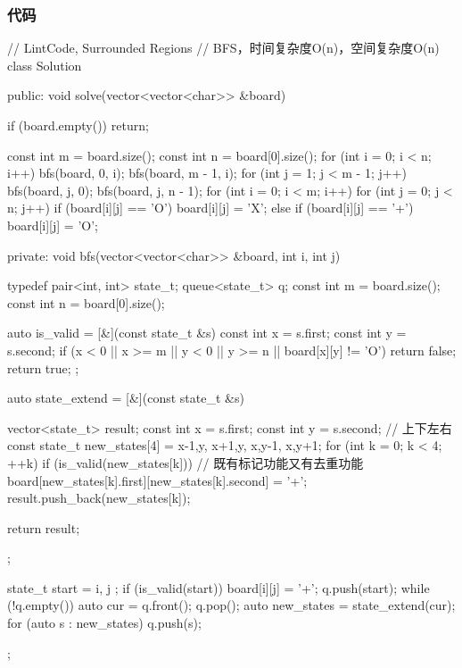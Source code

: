 \subsubsection{代码}
\begin{Code}
// LintCode, Surrounded Regions
// BFS，时间复杂度O(n)，空间复杂度O(n)
class Solution {
public:
    void solve(vector<vector<char>> &board) {
        if (board.empty()) return;

        const int m = board.size();
        const int n = board[0].size();
        for (int i = 0; i < n; i++) {
            bfs(board, 0, i);
            bfs(board, m - 1, i);
        }
        for (int j = 1; j < m - 1; j++) {
            bfs(board, j, 0);
            bfs(board, j, n - 1);
        }
        for (int i = 0; i < m; i++)
            for (int j = 0; j < n; j++)
                if (board[i][j] == 'O')
                    board[i][j] = 'X';
                else if (board[i][j] == '+')
                    board[i][j] = 'O';
    }
private:
    void bfs(vector<vector<char>> &board, int i, int j) {
        typedef pair<int, int> state_t;
        queue<state_t> q;
        const int m = board.size();
        const int n = board[0].size();

        auto is_valid = [&](const state_t &s) {
            const int x = s.first;
            const int y = s.second;
            if (x < 0 || x >= m || y < 0 || y >= n || board[x][y] != 'O')
                return false;
            return true;
        };

        auto state_extend = [&](const state_t &s) {
            vector<state_t> result;
            const int x = s.first;
            const int y = s.second;
            // 上下左右
            const state_t new_states[4] = {{x-1,y}, {x+1,y},
                    {x,y-1}, {x,y+1}};
            for (int k = 0; k < 4;  ++k) {
                if (is_valid(new_states[k])) {
                    // 既有标记功能又有去重功能
                    board[new_states[k].first][new_states[k].second] = '+';
                    result.push_back(new_states[k]);
                }
            }

            return result;
        };

        state_t start = { i, j };
        if (is_valid(start)) {
            board[i][j] = '+';
            q.push(start);
        }
        while (!q.empty()) {
            auto cur = q.front();
            q.pop();
            auto new_states = state_extend(cur);
            for (auto s : new_states) q.push(s);
        }
    }
};
\end{Code}


